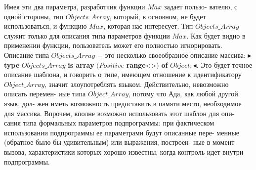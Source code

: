 Имея эти два параметра, разработчик функции $Max$ задает пользо-\linebreak
вателю, с одной стороны, тип $Objects\_Array$, который, в основном, не\linebreak
будет использоваться,  и функцию $Max$, которая нас интересует.  Тип\linebreak
$Objects\_Array$ служит только для описания типа параметров функции\linebreak
$Max$. Как будет видно в применении функции, пользователь может его\linebreak
полностью игнорировать. Описание типа $Objects\_Array$ $-$ это несколько\linebreak
своеобразное описание массива: $\blacktriangleright$ \textbf{type} $Objects\_Array$ \textbf{is array} $(Positive$\linebreak
\textbf{range}<>$)$ \textbf{of} $Object;\blacktriangleleft$. Это будет точное описание шаблона, и говорить\linebreak
о типе, имеющем отношение к идентификатору $Object\_Array$, значит\linebreak
злоупотреблять языком. Действительно, невозможно описать перемен-\linebreak
иые типа $Object\_Array$, потому что Ада, как любой другой язык, дол-\linebreak
жен иметь возможность предоставить в памяти место, необходимое для\linebreak
массива. Впрочем, вполне возможно использовать этот шаблон для опи-\linebreak
сания типа формальных параметров подпрограммы: при фактическом\linebreak
использовании подпрограммы ее параметрами будут описанные пере-\linebreak
менные (обратное было бы удивительным) или выражения, построен-\linebreak
ные в момент вызова, характеристики которых хорошо известны, когда\linebreak
контроль идет внутри подпрограммы.\\

